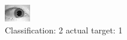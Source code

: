 \begin{figure}[h!]
\begin{center}
\includegraphics[width=0.60\columnwidth]{figures/ID1443_class_2_target_1.png}
\end{center}
\caption{ Classification: 2 actual target: 1}
\label{fig:ID1443_class_2_target_1}
\end{figure}
